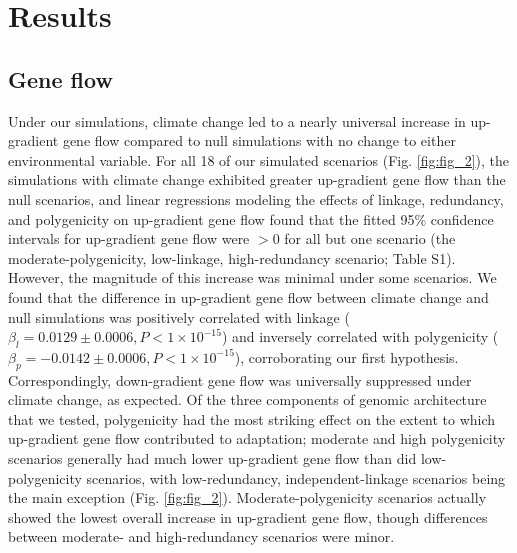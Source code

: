\documentclass[9pt,twocolumn,twoside,lineno]{new_article}
\begin{document}
\section*{Results}

\subsection*{Gene flow}
Under our simulations, climate change led to a nearly universal increase in up-gradient gene flow
compared to null simulations with no change to either environmental variable. For all 18 of our simulated scenarios (Fig. \ref{fig:fig_2}), the simulations with climate change exhibited greater up-gradient gene flow than the null scenarios, and linear regressions modeling the effects of linkage, redundancy, and polygenicity on up-gradient gene flow found that the 
fitted 95\% confidence intervals for up-gradient gene flow were $>0$ for all but
one scenario (the moderate-polygenicity, low-linkage, high-redundancy scenario; Table S1).
However, the magnitude of this increase was minimal under
some scenarios. We found that the difference in up-gradient gene flow between climate change and null simulations was positively correlated with linkage
($\beta_{l} = 0.0129\pm0.0006, P<1\times10^{-15}$)
and inversely correlated with polygenicity
($\beta_{p} = -0.0142\pm0.0006, P<1\times10^{-15}$),
corroborating our first hypothesis.
Correspondingly, down-gradient gene flow was 
universally suppressed under climate change, as expected.
Of the three components of genomic architecture that we tested,
polygenicity had the most striking effect on the extent to which
up-gradient gene flow contributed to adaptation;
moderate and high polygenicity scenarios generally had much lower
up-gradient gene flow than did low-polygenicity scenarios,
with low-redundancy, independent-linkage scenarios being the main exception (Fig. \ref{fig:fig_2}).
Moderate-polygenicity scenarios actually showed the lowest overall increase
in up-gradient gene flow, though differences between moderate- and
high-redundancy scenarios were minor.
\end{document}
